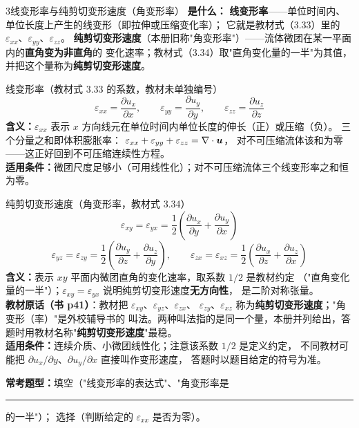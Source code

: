 \begin{kaodian}{3}{线变形率与纯剪切变形速度（角变形率）}
\textbf{是什么：}
\textbf{线变形率}——单位时间内、单位长度上产生的线变形（即拉伸或压缩变化率）；
它就是教材式（3.33）里的 $\varepsilon_{xx}$、$\varepsilon_{yy}$、$\varepsilon_{zz}$。
\textbf{纯剪切变形速度}（本册旧称"角变形率"）——流体微团在某一平面内的\textbf{直角变为非直角}的
变化速率；教材式（3.34）取"直角变化量的一半"为其值，并把这个量称为\textbf{纯剪切变形速度}。

\begin{gongshi}{线变形率（教材式 3.33 的系数，教材未单独编号）}
\[ \varepsilon_{xx}=\frac{\partial u_x}{\partial x},\qquad
   \varepsilon_{yy}=\frac{\partial u_y}{\partial y},\qquad
   \varepsilon_{zz}=\frac{\partial u_z}{\partial z} \]
\textbf{含义：}$\varepsilon_{xx}$ 表示 $x$ 方向线元在单位时间内单位长度的伸长（正）或压缩（负）。
三个分量之和即体积膨胀率：
$\varepsilon_{xx}+\varepsilon_{yy}+\varepsilon_{zz}=\nabla\cdot\bm{u}$，
对不可压缩流体该和为零——这正好回到不可压缩连续性方程。\\
\textbf{适用条件：}微团尺度足够小（可用线性化）；对不可压缩流体三个线变形率之和恒为零。
\end{gongshi}

\begin{gongshi}{纯剪切变形速度（角变形率，教材式 3.34）}
\[ \varepsilon_{xy}=\varepsilon_{yx}=\frac{1}{2}\!\left(\frac{\partial u_x}{\partial y}+\frac{\partial u_y}{\partial x}\right) \]
\[ \varepsilon_{yz}=\varepsilon_{zy}=\frac{1}{2}\!\left(\frac{\partial u_y}{\partial z}+\frac{\partial u_z}{\partial y}\right),\qquad
   \varepsilon_{zx}=\varepsilon_{xz}=\frac{1}{2}\!\left(\frac{\partial u_x}{\partial z}+\frac{\partial u_z}{\partial x}\right) \]
\textbf{含义：}表示 $xy$ 平面内微团直角的变化速率，取系数 $1/2$ 是教材约定
（"直角变化量的一半"）；$\varepsilon_{xy}=\varepsilon_{yx}$ 说明纯剪切变形速度\textbf{无方向性}，
是二阶对称张量。\\
\textbf{教材原话（书 p41）}：教材把 $\varepsilon_{xy}$、$\varepsilon_{yz}$、$\varepsilon_{zx}$、
$\varepsilon_{zy}$、$\varepsilon_{xz}$ 称为\textbf{纯剪切变形速度}；"角变形（率）"是外校辅导书的
叫法。两种叫法指的是同一个量，本册并列给出，答题时用教材名称"\textbf{纯剪切变形速度}"最稳。\\
\textbf{适用条件：}连续介质、小微团线性化；注意该系数 $1/2$ 是定义约定，
不同教材可能把 $\partial u_x/\partial y$、$\partial u_y/\partial x$ 直接叫作变形速度，
答题时以题目给定的符号为准。
\end{gongshi}

\textbf{常考题型：}填空（"线变形率的表达式"、"角变形率是\rule{2cm}{0.4pt}的一半"）；
选择（判断给定的 $\varepsilon_{xx}$ 是否为零）。


\end{kaodian}
